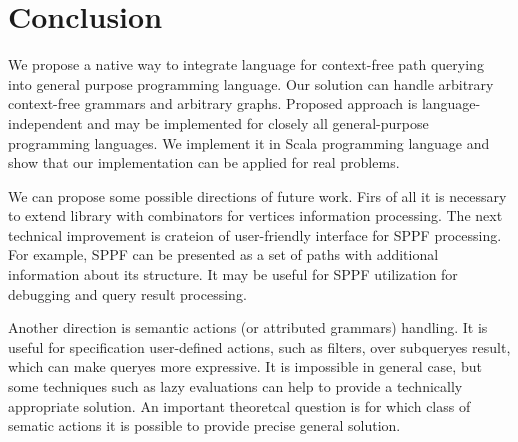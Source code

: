 \section{Conclusion}

We propose a native way to integrate language for context-free path querying into general purpose programming language.
Our solution can handle arbitrary context-free grammars and arbitrary graphs.
Proposed approach is language-independent and may be implemented for closely all general-purpose programming languages.
We implement it in Scala programming language and show that our implementation can be applied for real problems.

We can propose some possible directions of future work.
Firs of all it is necessary to extend library with combinators for vertices information processing.
The next technical improvement is crateion of user-friendly interface for SPPF processing.
For example, SPPF can be presented as a set of paths with additional information about its structure.
It may be useful for SPPF utilization for debugging and query result processing.

Another direction is semantic actions (or attributed grammars) handling.
It is useful for specification user-defined actions, such as filters, over subqueryes result, which can make queryes more expressive.
It is impossible in general case, but some techniques such as lazy evaluations can help to provide a technically appropriate solution.
An important theoretcal question is for which class of sematic actions it is possible to provide precise general solution.

